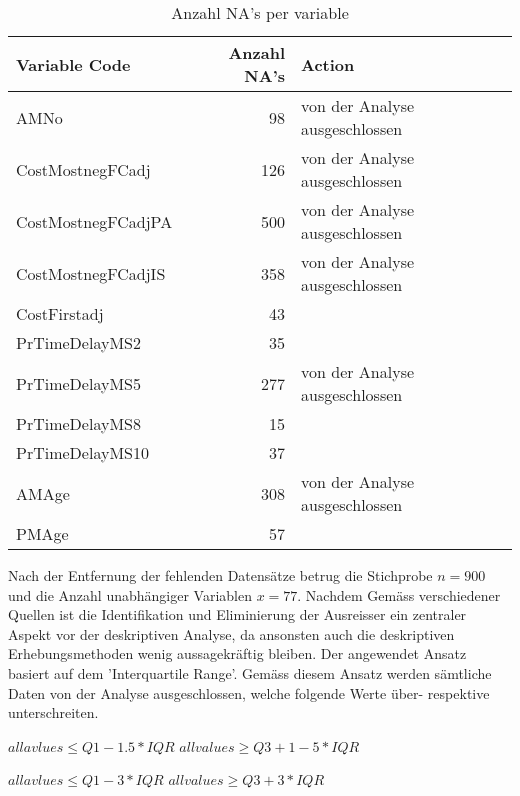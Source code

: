 \documentclass[11pt]{article}
\begin{document}
\newline
\begin{table}
	\centering
	\caption{Anzahl NA's per variable}
	\begin{tabular} {| l| r | l |}
		\textbf{Variable Code} & \textbf{Anzahl NA's} & \textbf{Action}\\\hline
		AMNo & 98 & von der Analyse ausgeschlossen\\
		CostMostnegFCadj & 126 & von der Analyse ausgeschlossen\\
		CostMostnegFCadjPA & 500 & von der Analyse ausgeschlossen\\
		CostMostnegFCadjIS & 358 & von der Analyse ausgeschlossen\\
		CostFirstadj & 43 &\\
		PrTimeDelayMS2 & 35 &\\
		PrTimeDelayMS5 & 277 & von der Analyse ausgeschlossen\\
		PrTimeDelayMS8 & 15 &\\
		PrTimeDelayMS10 & 37 &\\
		AMAge & 308  & von der Analyse ausgeschlossen\\
		PMAge & 57 & \\		
	\end{tabular}
\end{table}
Nach der Entfernung der fehlenden Datensätze betrug die Stichprobe $n = 900$ und die Anzahl unabhängiger Variablen $ x = 77$. Nachdem 
\newline
Gemäss verschiedener Quellen ist die Identifikation und Eliminierung der Ausreisser ein zentraler Aspekt vor der deskriptiven Analyse, da ansonsten auch die deskriptiven Erhebungsmethoden wenig aussagekräftig bleiben. Der angewendet Ansatz basiert auf dem 'Interquartile Range'. Gemäss diesem Ansatz werden sämtliche Daten von der Analyse ausgeschlossen, welche folgende Werte über- respektive unterschreiten.
\newline\newline
\begin{centering}
	$ all avlues \leq Q1 - 1.5 * IQR$
	\newline
	$ all values \geq Q3 + 1-5 * IQR$
\end{centering}
\newline
\newline
\begin{centering}
	$ all avlues \leq Q1 - 3 * IQR$
	\newline
	$ all values \geq Q3 + 3 * IQR$
\end{centering}
\newline\newline
\end{document}
